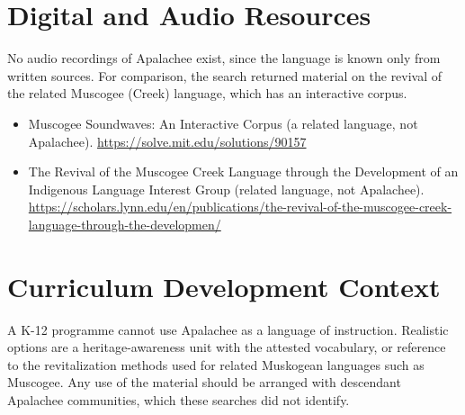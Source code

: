 \documentclass[12pt]{article}
\begin{document}
\section{Digital and Audio Resources}
No audio recordings of Apalachee exist, since the language is known only from written sources. For comparison, the search returned material on the revival of the related Muscogee (Creek) language, which has an interactive corpus.
\begin{itemize}
\item Muscogee Soundwaves: An Interactive Corpus (a related language, not Apalachee). \url{https://solve.mit.edu/solutions/90157}
\item The Revival of the Muscogee Creek Language through the Development of an Indigenous Language Interest Group (related language, not Apalachee). \url{https://scholars.lynn.edu/en/publications/the-revival-of-the-muscogee-creek-language-through-the-developmen/}
\end{itemize}

\section{Curriculum Development Context}
A K-12 programme cannot use Apalachee as a language of instruction. Realistic options are a heritage-awareness unit with the attested vocabulary, or reference to the revitalization methods used for related Muskogean languages such as Muscogee. Any use of the material should be arranged with descendant Apalachee communities, which these searches did not identify.
\end{document}
